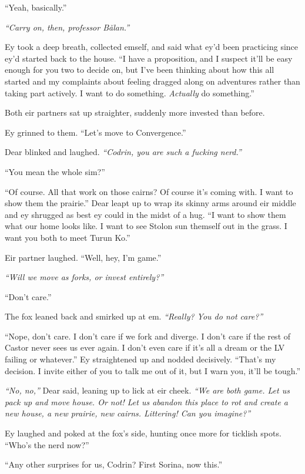 ``Yeah, basically.''

\emph{``Carry on, then, professor Bălan.''}

Ey took a deep breath, collected emself, and said what ey'd been practicing since ey'd started back to the house. ``I have a proposition, and I suspect it'll be easy enough for you two to decide on, but I've been thinking about how this all started and my complaints about feeling dragged along on adventures rather than taking part actively. I want to do something. \emph{Actually} do something.''

Both eir partners sat up straighter, suddenly more invested than before.

Ey grinned to them. ``Let's move to Convergence.''

Dear blinked and laughed. \emph{``Codrin, you are such a fucking nerd.''}

``You mean the whole sim?''

``Of course. All that work on those cairns? Of course it's coming with. I want to show them the prairie.'' Dear leapt up to wrap its skinny arms around eir middle and ey shrugged as best ey could in the midst of a hug. ``I want to show them what our home looks like. I want to see Stolon sun themself out in the grass. I want you both to meet Turun Ko.''

Eir partner laughed. ``Well, hey, I'm game.''

\emph{``Will we move as forks, or invest entirely?''}

``Don't care.''

The fox leaned back and smirked up at em. \emph{``Really? You do not care?''}

``Nope, don't care. I don't care if we fork and diverge. I don't care if the rest of Castor never sees us ever again. I don't even care if it's all a dream or the LV failing or whatever.'' Ey straightened up and nodded decisively. ``That's my decision. I invite either of you to talk me out of it, but I warn you, it'll be tough.''

\emph{``No, no,''} Dear said, leaning up to lick at eir cheek. \emph{``We are both game. Let us pack up and move house. Or not! Let us abandon this place to rot and create a new house, a new prairie, new cairns. Littering! Can you imagine?''}

Ey laughed and poked at the fox's side, hunting once more for ticklish spots. ``Who's the nerd now?''

``Any other surprises for us, Codrin? First Sorina, now this.''

